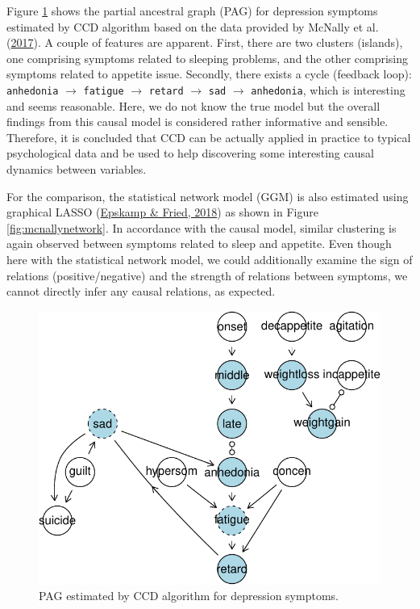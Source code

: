 \documentclass[
]{article}
\begin{document}
Figure \ref{fig:mcnallypag} shows the partial ancestral graph (PAG) for depression symptoms estimated by CCD algorithm based on the data provided by McNally et al. (\protect\hyperlink{ref-mcnally2017}{2017}). A couple of features are apparent. First, there are two clusters (islands), one comprising symptoms related to sleeping problems, and the other comprising symptoms related to appetite issue. Secondly, there exists a cycle (feedback loop): \texttt{anhedonia} \(\rightarrow\) \texttt{fatigue} \(\rightarrow\) \texttt{retard} \(\rightarrow\) \texttt{sad} \(\rightarrow\) \texttt{anhedonia}, which is interesting and seems reasonable. Here, we do not know the true model but the overall findings from this causal model is considered rather informative and sensible. Therefore, it is concluded that CCD can be actually applied in practice to typical psychological data and be used to help discovering some interesting causal dynamics between variables.

For the comparison, the statistical network model (GGM) is also estimated using graphical LASSO (\protect\hyperlink{ref-epskamp_tutorial_2018}{Epskamp \& Fried, 2018}) as shown in Figure \ref{fig:mcnallynetwork}. In accordance with the causal model, similar clustering is again observed between symptoms related to sleep and appetite. Even though here with the statistical network model, we could additionally examine the sign of relations (positive/negative) and the strength of relations between symptoms, we cannot directly infer any causal relations, as expected.

\vspace{0.5cm}

\newcommand{\udensdot}[1]{
    \tikz[baseline=(todotted.base)]{
        \node[inner sep=1pt,outer sep=0pt] (todotted) {#1};
        \draw[densely dotted] (todotted.south west) -- (todotted.south east);
    }
}

\begin{figure}

{\centering \includegraphics{Individual-report_files/figure-latex/mcnallypag-1} 

}

\caption{PAG estimated by CCD algorithm for depression symptoms.}\label{fig:mcnallypag}
\end{figure}
\end{document}
